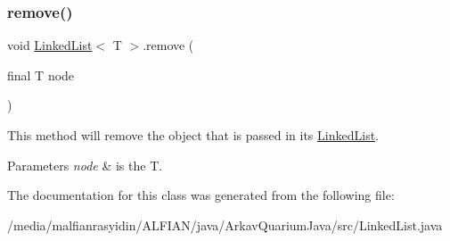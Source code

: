 \subsubsection{\texorpdfstring{remove()}{remove()}}
{\footnotesize\ttfamily void \mbox{\hyperlink{class_linked_list}{Linked\+List}}$<$ T $>$.remove (\begin{DoxyParamCaption}\item[{final T}]{node }\end{DoxyParamCaption})\hspace{0.3cm}{\ttfamily [inline]}}

This method will remove the object that is passed in its \mbox{\hyperlink{class_linked_list}{Linked\+List}}.


\begin{DoxyParams}{Parameters}
{\em node} & is the T. \\
\hline
\end{DoxyParams}


The documentation for this class was generated from the following file\+:\begin{DoxyCompactItemize}
\item 
/media/malfianrasyidin/\+A\+L\+F\+I\+A\+N/java/\+Arkav\+Quarium\+Java/src/Linked\+List.\+java\end{DoxyCompactItemize}
